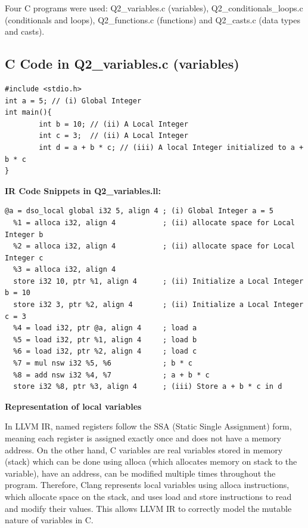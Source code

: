 \documentclass[11pt,a4paper]{article}
\begin{document}
Four C programs were used: Q2\_variables.c (variables), Q2\_conditionals\_loops.c (conditionals and loops), Q2\_functions.c (functions) and Q2\_casts.c (data types and casts).

\subsection{C Code in Q2\_variables.c (variables)}

\begin{lstlisting}
#include <stdio.h>
int a = 5; // (i) Global Integer
int main(){
        int b = 10; // (ii) A Local Integer
        int c = 3;  // (ii) A Local Integer
        int d = a + b * c; // (iii) A local Integer initialized to a + b * c
}
\end{lstlisting}

\medskip\noindent\textbf{IR Code Snippets in Q2\_variables.ll:}\par

\begin{lstlisting}
@a = dso_local global i32 5, align 4 ; (i) Global Integer a = 5
  %1 = alloca i32, align 4           ; (ii) allocate space for Local Integer b
  %2 = alloca i32, align 4           ; (ii) allocate space for Local Integer c
  %3 = alloca i32, align 4
  store i32 10, ptr %1, align 4      ; (ii) Initialize a Local Integer b = 10
  store i32 3, ptr %2, align 4       ; (ii) Initialize a Local Integer c = 3
  %4 = load i32, ptr @a, align 4     ; load a
  %5 = load i32, ptr %1, align 4     ; load b
  %6 = load i32, ptr %2, align 4     ; load c
  %7 = mul nsw i32 %5, %6            ; b * c
  %8 = add nsw i32 %4, %7            ; a + b * c
  store i32 %8, ptr %3, align 4      ; (iii) Store a + b * c in d
\end{lstlisting}

\textbf{Representation of local variables}


In LLVM IR, named registers follow the SSA (Static Single Assignment) form, meaning each register is assigned exactly once and does not have a memory address. On the other hand, C variables are real variables stored in memory (stack) which can be done using alloca (which allocates memory on stack to the variable), have an address, can be modified multiple times throughout the program. Therefore, Clang represents local variables using alloca instructions, which allocate space on the stack, and uses load and store instructions to read and modify their values. This allows LLVM IR to correctly model the mutable nature of variables in C. 
\end{document}
